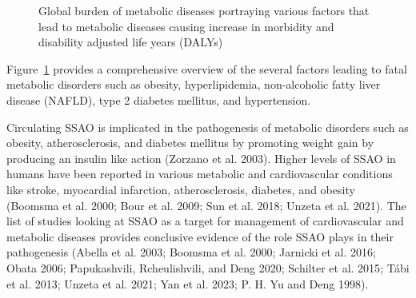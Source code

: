 \documentclass[
  letterpaper,
  DIV=11,
  numbers=noendperiod]{scrreprt}
\begin{document}
\begin{figure}


\caption{\label{fig-DALY}Global burden of metabolic diseases portraying
various factors that lead to metabolic diseases causing increase in
morbidity and disability adjusted life years (DALYs)}

\end{figure}%

Figure~\ref{fig-DALY} provides a comprehensive overview of the several
factors leading to fatal metabolic disorders such as obesity,
hyperlipidemia, non-alcoholic fatty liver disease (NAFLD), type 2
diabetes mellitus, and hypertension.

Circulating SSAO is implicated in the pathogenesis of metabolic
disorders such as obesity, atherosclerosis, and diabetes mellitus by
promoting weight gain by producing an insulin like action (Zorzano et
al. 2003). Higher levels of SSAO in humans have been reported in various
metabolic and cardiovascular conditions like stroke, myocardial
infarction, atherosclerosis, diabetes, and obesity (Boomsma et al. 2000;
Bour et al. 2009; Sun et al. 2018; Unzeta et al. 2021). The list of
studies looking at SSAO as a target for management of cardiovascular and
metabolic diseases provides conclusive evidence of the role SSAO plays
in their pathogenesis (Abella et al. 2003; Boomsma et al. 2000; Jarnicki
et al. 2016; Obata 2006; Papukashvili, Rcheulishvili, and Deng 2020;
Schilter et al. 2015; Tábi et al. 2013; Unzeta et al. 2021; Yan et al.
2023; P. H. Yu and Deng 1998).
\end{document}
